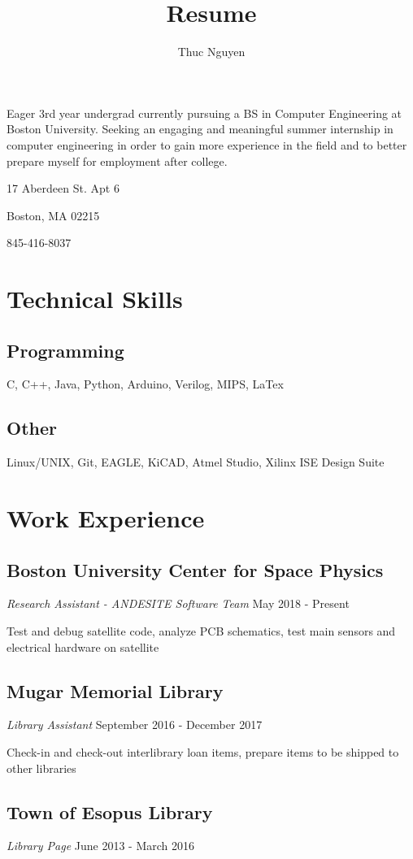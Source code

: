 \documentclass{article}
\renewcommand{\maketitle}{\begin{center}{\huge\bfseries\theauthor}\vspace{.25em}
\end{center}}
\begin{document}
\title{Resume}
\author{Thuc Nguyen}
\maketitle

Eager 3rd year undergrad currently pursuing a BS in Computer Engineering at Boston University. Seeking an engaging and meaningful summer internship in computer engineering in order to gain more experience in the field and to better prepare myself for employment after college.

17 Aberdeen St. Apt 6

Boston, MA 02215

845-416-8037


\section{Technical Skills}
\subsection{Programming}
C, C++, Java, Python, Arduino, Verilog, MIPS, LaTex
\subsection{Other}
Linux/UNIX, Git, EAGLE, KiCAD, Atmel Studio, Xilinx ISE Design Suite

\section{Work Experience}
\subsection{Boston University Center for Space Physics}  \textit{Research Assistant - ANDESITE Software Team}
May 2018 - Present

Test and debug satellite code, analyze PCB schematics, test main sensors and electrical hardware on satellite
\subsection{Mugar Memorial Library} \textit{Library Assistant}
September 2016 - December 2017

Check-in and check-out interlibrary loan items, prepare items to be shipped to other libraries
\subsection{Town of Esopus Library} \textit{Library Page}
June 2013 - March 2016
\end{document}
